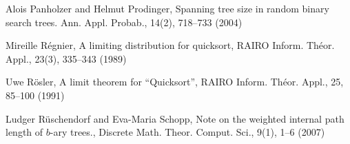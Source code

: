 \documentclass{amsart}       %
\begin{document}
\begin{thebibliography}{}
Alois Panholzer and Helmut Prodinger,
 Spanning tree size in random binary search trees.
 Ann. Appl. Probab., 14(2), 718--733 (2004)

Mireille R{\'e}gnier,
 A limiting distribution for quicksort,
RAIRO Inform. Th\'eor. Appl., 23(3),
  335--343 (1989)

Uwe R{\"o}sler,
 A limit theorem for ``Quicksort'',
 RAIRO Inform. Th\'eor. Appl., 25, 85--100 (1991)

Ludger R{\"u}schendorf and Eva-Maria Schopp,
 Note on the weighted internal path length of $b$-ary trees.,
 Discrete Math. Theor. Comput. Sci., 9(1),
  1--6  (2007)

  
 
  
  
\end{thebibliography}
\end{document}
